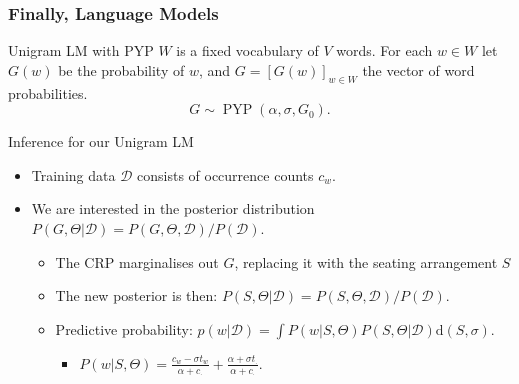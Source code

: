 \documentclass{beamer}
\begin{document}
\begin{frame}
    \frametitle{Finally, Language Models}

    \begin{block}{Unigram LM with PYP}
        $W$ is a fixed vocabulary of $V$ words. For each $w\in W$ let $G(w)$ be the probability of $w$, and $G=[G(w)]_{w\in W}$ the vector of word probabilities. 
\[ G \sim \operatorname{PYP}(\alpha, \sigma, G_0). \] 
    \end{block}

    \begin{block}{Inference for our Unigram LM}
        \begin{itemize}
            \item Training data $\mathcal{D}$ consists of occurrence counts $c_{w}$.
            \item We are interested in the posterior distribution $P(G,\Theta|\mathcal{D}) = P(G,\Theta,\mathcal{D})/P(\mathcal{D})$.
            \begin{itemize}
                \item The CRP marginalises out $G$, replacing it with the seating arrangement $S$
                \item The new posterior is then: $P(S,\Theta|\mathcal{D})=P(S,\Theta,\mathcal{D})/P(\mathcal{D})$.
                \item Predictive probability: $p(w|\mathcal{D})=\int P(w|S,\Theta)P(S,\Theta|\mathcal{D})\text{d}(S,\sigma)$.
                \begin{itemize}
                    \item $P(w|S,\Theta) = \frac{c_w-\sigma t_w}{\alpha+c_\cdot} + \frac{\alpha+\sigma t_\cdot}{\alpha+c_\cdot}$.
                \end{itemize}
            \end{itemize}
        \end{itemize}
    \end{block}


\end{frame}
\end{document}
